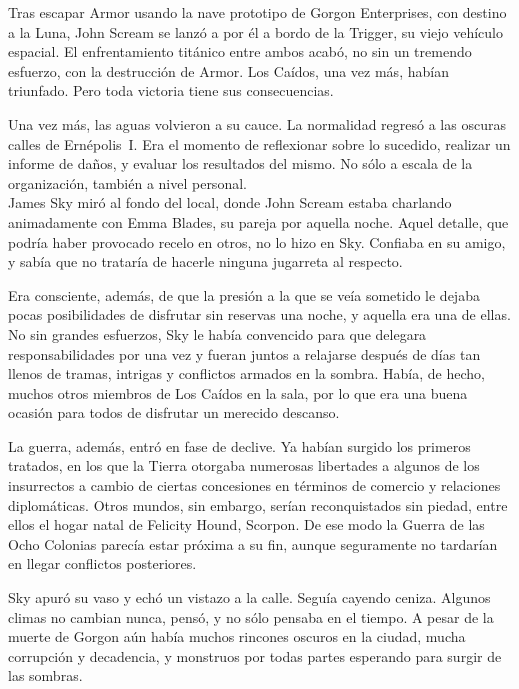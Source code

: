 \begin{prev}
    Tras escapar Armor usando la nave prototipo de Gorgon Enterprises, con destino a la Luna, John Scream se lanzó a por él a bordo de la Trigger, su viejo vehículo espacial. El enfrentamiento titánico entre ambos acabó, no sin un tremendo esfuerzo, con la destrucción de Armor. Los Caídos, una vez más, habían triunfado. Pero toda victoria tiene sus consecuencias.
\end{prev}

\noindent{}Una vez más, las aguas volvieron a su cauce. La normalidad regresó a las oscuras calles de Ernépolis~I. Era el momento de reflexionar sobre lo sucedido, realizar un informe de daños, y evaluar los resultados del mismo. No sólo a escala de la organización, también a nivel personal.\\

\noindent{}James Sky miró al fondo del local, donde John Scream estaba charlando animadamente con Emma Blades, su pareja por aquella noche. Aquel detalle, que podría haber provocado recelo en otros, no lo hizo en Sky. Confiaba en su amigo, y sabía que no trataría de hacerle ninguna jugarreta al respecto.

Era consciente, además, de que la presión a la que se veía sometido le dejaba pocas posibilidades de disfrutar sin reservas una noche, y aquella era una de ellas. No sin grandes esfuerzos, Sky le había convencido para que delegara responsabilidades por una vez y fueran juntos a relajarse después de días tan llenos de tramas, intrigas y conflictos armados en la sombra. Había, de hecho, muchos otros miembros de Los Caídos en la sala, por lo que era una buena ocasión para todos de disfrutar un merecido descanso.

La guerra, además, entró en fase de declive. Ya habían surgido los primeros tratados, en los que la Tierra otorgaba numerosas libertades a algunos de los insurrectos a cambio de ciertas concesiones en términos de comercio y relaciones diplomáticas. Otros mundos, sin embargo, serían reconquistados sin piedad, entre ellos el hogar natal de Felicity Hound, Scorpon. De ese modo la Guerra de las Ocho Colonias parecía estar próxima a su fin, aunque seguramente no tardarían en llegar conflictos posteriores.

Sky apuró su vaso y echó un vistazo a la calle. Seguía cayendo ceniza. Algunos climas no cambian nunca, pensó, y no sólo pensaba en el tiempo. A pesar de la muerte de Gorgon aún había muchos rincones oscuros en la ciudad, mucha corrupción y decadencia, y monstruos por todas partes esperando para surgir de las sombras.


